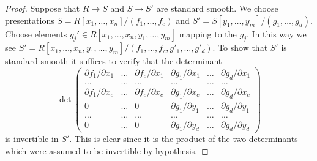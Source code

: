 \documentclass[10pt,a4paper]{amsart}
\theoremstyle{plain}
\theoremstyle{definition}
\theoremstyle{remark}
\numberwithin{equation}{subsection}
\begin{document}
\begin{proof}
Suppose that $R \to S$ and $S \to S'$ are standard smooth. We choose
presentations
$S =  R[x_1, \ldots, x_n]/(f_1, \ldots, f_c)$
and
$S' = S[y_1, \ldots, y_m]/(g_1, \ldots, g_d)$.
Choose elements $g_j' \in R[x_1, \ldots, x_n, y_1, \ldots, y_m]$ mapping
to the $g_j$. In this way we see
$S' = R[x_1, \ldots, x_n, y_1, \ldots, y_m]/
(f_1, \ldots, f_c, g'_1, \ldots, g'_d)$.
To show that $S'$ is standard smooth it suffices to verify
that the determinant
$$
\det
\left(
\begin{matrix}
\partial f_1/\partial x_1 &
\ldots &
\partial f_c/\partial x_1 &
\partial g_1/\partial x_1 &
\ldots &
\partial g_d/\partial x_1 \\
\ldots &
\ldots &
\ldots &
\ldots &
\ldots &
\ldots  \\
\partial f_1/\partial x_c &
\ldots &
\partial f_c/\partial x_c &
\partial g_1/\partial x_c &
\ldots &
\partial g_d/\partial x_c \\
0 &
\ldots &
0 &
\partial g_1/\partial y_1 &
\ldots &
\partial g_d/\partial y_1 \\
\ldots &
\ldots &
\ldots &
\ldots &
\ldots &
\ldots  \\
0 &
\ldots &
0 &
\partial g_1/\partial y_d &
\ldots &
\partial g_d/\partial y_d
\end{matrix}
\right)
$$
is invertible in $S'$. This is clear since it is the product
of the two determinants which were assumed to be invertible
by hypothesis.
\end{proof}
\end{document}
